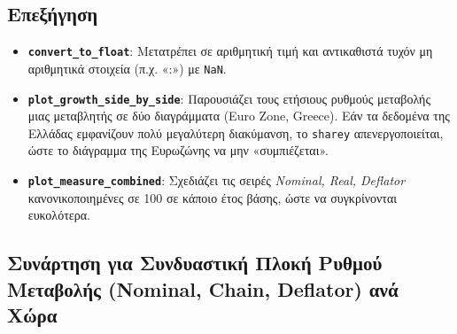 \documentclass{book}
\begin{document}
\subsection*{Επεξήγηση}
\begin{itemize}
    \item \textbf{\texttt{convert\_to\_float}}: Μετατρέπει σε αριθμητική τιμή και αντικαθιστά τυχόν μη αριθμητικά στοιχεία (π.χ. «:») με \texttt{NaN}.
    \item \textbf{\texttt{plot\_growth\_side\_by\_side}}: Παρουσιάζει τους ετήσιους ρυθμούς μεταβολής μιας μεταβλητής σε δύο διαγράμματα (Euro Zone, Greece). Εάν τα δεδομένα της Ελλάδας εμφανίζουν πολύ μεγαλύτερη διακύμανση, το \texttt{sharey} απενεργοποιείται, ώστε το διάγραμμα της Ευρωζώνης να μην «συμπιέζεται».
    \item \textbf{\texttt{plot\_measure\_combined}}: Σχεδιάζει τις σειρές \emph{Nominal, Real, Deflator} κανονικοποιημένες σε 100 σε κάποιο έτος βάσης, ώστε να συγκρίνονται ευκολότερα.

\end{itemize}

\subsection{Συνάρτηση για Συνδυαστική Πλοκή Ρυθμού Μεταβολής (Nominal, Chain, Deflator) ανά Χώρα}
\end{document}
